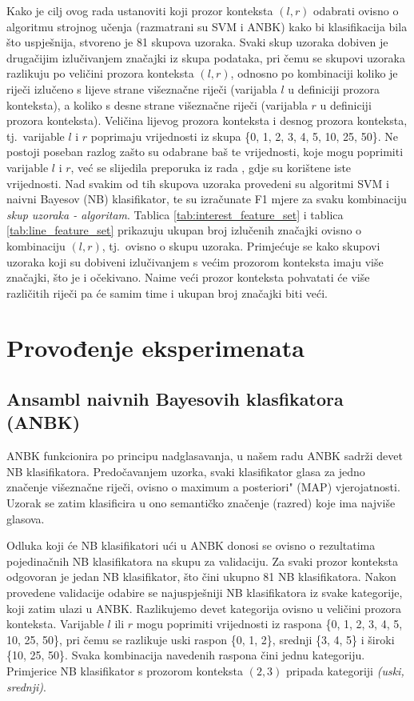\documentclass[10pt, a4paper]{article}
\begin{document}
Kako je cilj ovog rada ustanoviti koji prozor konteksta $(l,r)$ odabrati
ovisno o algoritmu strojnog učenja (razmatrani su SVM i ANBK)
kako bi klasifikacija bila što uspješnija, stvoreno je 81 skupova uzoraka. Svaki
skup uzoraka dobiven je drugačijim izlučivanjem značajki iz skupa podataka,
pri čemu se skupovi uzoraka razlikuju po veličini prozora konteksta $(l, r)$,
odnosno po kombinaciji koliko je riječi izlučeno s lijeve strane višeznačne riječi (varijabla $l$ u definiciji prozora konteksta), a koliko s desne strane višeznačne riječi (varijabla $r$ u definiciji prozora konteksta). Veličina lijevog prozora konteksta i desnog prozora konteksta, tj.~varijable
$l$ i $r$ poprimaju vrijednosti iz skupa \{0, 1, 2, 3, 4, 5, 10, 25, 50\}. Ne postoji poseban
razlog zašto su odabrane baš te vrijednosti, koje mogu poprimiti varijable $l$ i $r$,
već se slijedila preporuka iz rada \citep{pedersen}, gdje su korištene iste vrijednosti.
Nad svakim od tih skupova uzoraka provedeni su algoritmi SVM i naivni Bayesov (NB) klasifikator, te su izračunate F1 mjere za svaku kombinaciju \emph{skup uzoraka - algoritam}.
Tablica \ref{tab:interest_feature_set} i tablica \ref{tab:line_feature_set} prikazuju ukupan broj izlučenih značajki ovisno o kombinaciju $(l,r)$, tj.~ovisno o skupu uzoraka. Primjećuje
se kako skupovi uzoraka koji su dobiveni izlučivanjem s većim prozorom konteksta imaju
više značajki, što je i očekivano. Naime veći prozor konteksta pohvatati će više 
različitih riječi pa će samim time i ukupan broj značajki biti veći.

\section{Provođenje eksperimenata}
\subsection{Ansambl naivnih Bayesovih klasfikatora (ANBK)}
ANBK funkcionira po principu nadglasavanja, u našem radu ANBK sadrži devet NB klasifikatora.
Predočavanjem uzorka, svaki klasifikator glasa za jedno značenje višeznačne riječi, 
ovisno o \glqq maximum a posteriori" (MAP) vjerojatnosti. Uzorak se 
zatim klasificira u ono semantičko značenje (razred) koje ima najviše glasova.

Odluka koji će NB klasifikatori ući u ANBK donosi se ovisno o rezultatima pojedinačnih
NB klasifikatora na skupu za validaciju.
Za svaki prozor konteksta odgovoran je jedan
NB klasifikator, što čini ukupno 81 NB klasifikatora. 
Nakon provedene validacije odabire se najuspješniji NB klasifikatora
iz svake kategorije, koji zatim ulazi u ANBK. 
Razlikujemo devet kategorija ovisno u veličini prozora konteksta.
Varijable $l$ ili $r$ mogu poprimiti vrijednosti iz raspona \{0, 1, 2, 3, 4, 5, 10, 25, 50\},
pri čemu se razlikuje uski raspon \{0, 1, 2\}, srednji \{3, 4, 5\} i široki \{10, 25, 50\}.
Svaka kombinacija navedenih raspona čini jednu kategoriju. Primjerice
NB klasifikator s prozorom konteksta $(2,3)$ pripada kategoriji \emph{(uski, srednji)}.
\end{document}
